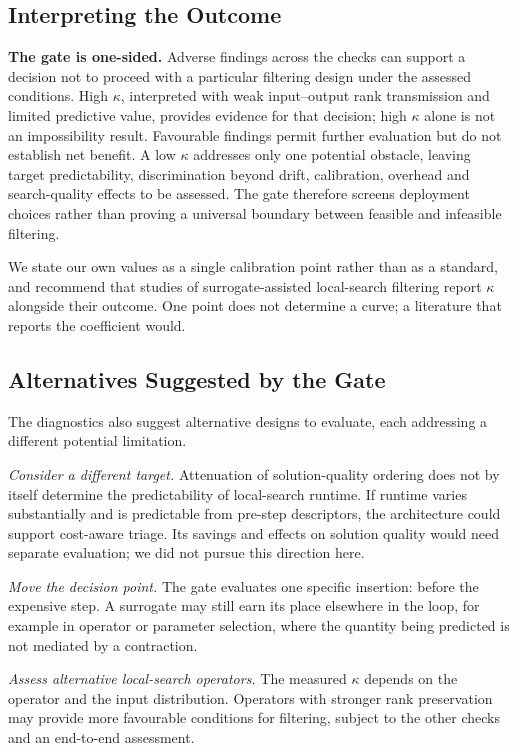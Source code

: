 \documentclass[a4paper,fleqn]{cas-dc}
\begin{document}
\subsection{Interpreting the Outcome}\label{sec:gate-interpret}

\textbf{The gate is one-sided.} Adverse findings across the checks can support
a decision not to proceed with a particular filtering design under the assessed
conditions. High $\kappa$, interpreted with weak input--output rank transmission
and limited predictive value, provides evidence for that decision; high
$\kappa$ alone is not an impossibility result. Favourable findings permit
further evaluation but do not establish net benefit. A low $\kappa$ addresses
only one potential obstacle, leaving target predictability, discrimination
beyond drift, calibration, overhead and search-quality effects to be assessed.
The gate therefore screens deployment choices rather than proving a universal
boundary between feasible and infeasible filtering.

We state our own values as a single calibration point rather than as a standard,
and recommend that studies of surrogate-assisted local-search filtering report
$\kappa$ alongside their outcome. One point does not determine a curve; a
literature that reports the coefficient would.

\subsection{Alternatives Suggested by the Gate}\label{sec:gate-alternatives}

The diagnostics also suggest alternative designs to evaluate, each addressing
a different potential limitation.

\emph{Consider a different target.} Attenuation of solution-quality ordering
does not by itself determine the predictability of local-search runtime. If
runtime varies substantially and is predictable from pre-step descriptors, the
architecture could support cost-aware triage. Its savings and effects on solution
quality would need separate evaluation; we did not pursue this direction here.

\emph{Move the decision point.} The gate evaluates one specific insertion:
before the expensive step. A surrogate may still earn its place elsewhere in the
loop, for example in operator or parameter selection, where the quantity being
predicted is not mediated by a contraction.

\emph{Assess alternative local-search operators.} The measured $\kappa$ depends
on the operator and the input distribution. Operators with stronger rank
preservation may provide more favourable conditions for filtering, subject to
the other checks and an end-to-end assessment.
\end{document}
